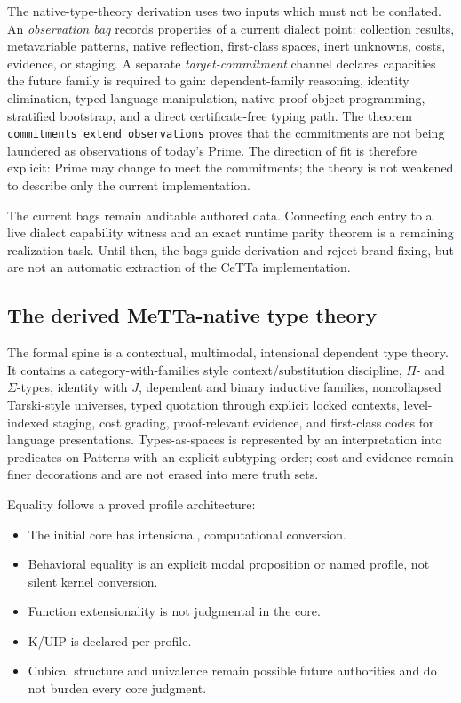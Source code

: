 \documentclass[11pt]{article}
\newcommand{\code}[1]{\texttt{#1}}
\begin{document}
The native-type-theory derivation uses two inputs which must not be conflated.
An \emph{observation bag} records properties of a current dialect point: collection
results, metavariable patterns, native reflection, first-class spaces, inert
unknowns, costs, evidence, or staging.  A separate
\emph{target-commitment} channel declares capacities the future family is required
to gain: dependent-family reasoning, identity elimination, typed language
manipulation, native proof-object programming, stratified bootstrap, and a direct
certificate-free typing path.  The theorem
\code{commitments\_extend\_observations} proves that the commitments are not being
laundered as observations of today's Prime.  The direction of fit is therefore
explicit: Prime may change to meet the commitments; the theory is not weakened to
describe only the current implementation.

The current bags remain auditable authored data.  Connecting each entry to a live
dialect capability witness and an exact runtime parity theorem is a remaining
realization task.  Until then, the bags guide derivation and reject brand-fixing,
but are not an automatic extraction of the CeTTa implementation.

\subsection{The derived MeTTa-native type theory}

The formal spine is a contextual, multimodal, intensional dependent type theory.
It contains a category-with-families style context/substitution discipline,
$\Pi$- and $\Sigma$-types, identity with $J$, dependent and binary inductive
families, noncollapsed Tarski-style universes, typed quotation through explicit
locked contexts, level-indexed staging, cost grading, proof-relevant evidence, and
first-class codes for language presentations.  Types-as-spaces is represented by
an interpretation into predicates on Patterns with an explicit subtyping order;
cost and evidence remain finer decorations and are not erased into mere truth
sets.

Equality follows a proved profile architecture:

\begin{itemize}
\item The initial core has intensional, computational conversion.
\item Behavioral equality is an explicit modal proposition or named profile, not
  silent kernel conversion.
\item Function extensionality is not judgmental in the core.
\item K/UIP is declared per profile.
\item Cubical structure and univalence remain possible future authorities and do
  not burden every core judgment.
\end{itemize}
\end{document}
